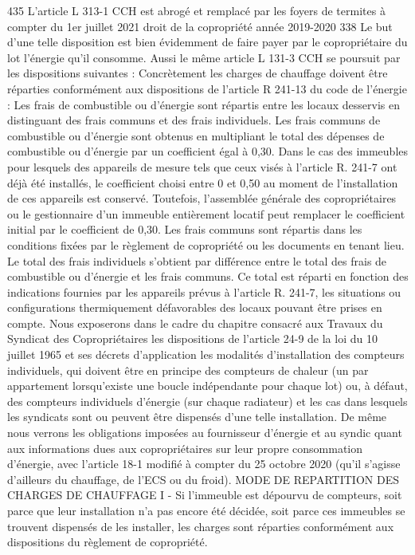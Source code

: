 		435 L’article L 313-1 CCH est abrogé et remplacé par les foyers de termites à compter du 1er juillet 2021
		droit de la copropriété année 2019-2020
		338
		Le but d'une telle disposition est bien évidemment de faire payer par le copropriétaire du lot l'énergie qu'il consomme. Aussi le même article L 131-3 CCH se poursuit par les dispositions suivantes :
		Concrètement les charges de chauffage doivent être réparties conformément aux dispositions de l’article R 241-13 du code de l’énergie :
		Les frais de combustible ou d'énergie sont répartis entre les locaux desservis en distinguant des frais communs et des frais individuels. Les frais communs de combustible ou d'énergie sont obtenus en multipliant le total des dépenses de combustible ou d'énergie par un coefficient égal à 0,30. Dans le cas des immeubles pour lesquels des appareils de mesure tels que ceux visés à l'article R. 241-7 ont déjà été installés, le coefficient choisi entre 0 et 0,50 au moment de l'installation de ces appareils est conservé. Toutefois, l'assemblée générale des copropriétaires ou le gestionnaire d'un immeuble entièrement locatif peut remplacer le coefficient initial par le coefficient de 0,30. Les frais communs sont répartis dans les conditions fixées par le règlement de copropriété ou les documents en tenant lieu. Le total des frais individuels s'obtient par différence entre le total des frais de combustible ou d'énergie et les frais communs. Ce total est réparti en fonction des indications fournies par les appareils prévus à l'article R. 241-7, les situations ou configurations thermiquement défavorables des locaux pouvant être prises en compte.
		Nous exposerons dans le cadre du chapitre consacré aux Travaux du Syndicat des Copropriétaires les dispositions de l’article 24-9 de la loi du 10 juillet 1965 et ses décrets d’application les modalités d’installation des compteurs individuels, qui doivent être en principe des compteurs de chaleur (un par appartement lorsqu’existe une boucle indépendante pour chaque lot) ou, à défaut, des compteurs individuels d’énergie (sur chaque radiateur) et les cas dans lesquels les syndicats sont ou peuvent être dispensés d’une telle installation. De même nous verrons les obligations imposées au fournisseur d’énergie et au syndic quant aux informations dues aux copropriétaires sur leur propre consommation d’énergie, avec l’article 18-1 modifié à compter du 25 octobre 2020 (qu’il s’agisse d’ailleurs du chauffage, de l’ECS ou du froid).
		MODE DE REPARTITION DES CHARGES DE CHAUFFAGE
		I - Si l’immeuble est dépourvu de compteurs, soit parce que leur installation n’a pas encore été décidée, soit parce ces immeubles se trouvent dispensés de les installer, les charges sont réparties conformément aux dispositions du règlement de copropriété.
